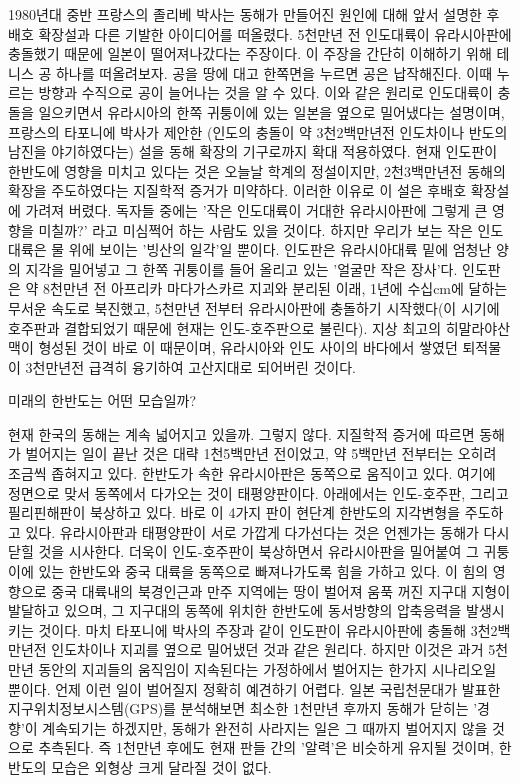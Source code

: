 \documentclass[12pt,a4paper]{book}
\begin{document}
1980년대 중반 프랑스의 졸리베 박사는 동해가 만들어진 원인에 대해 앞서 설명한 후배호 확장설과 다른 기발한 아이디어를 떠올렸다. 5천만년 전 인도대륙이 유라시아판에 충돌했기 때문에 일본이 떨어져나갔다는 주장이다. 이 주장을 간단히 이해하기 위해 테니스 공 하나를 떠올려보자. 공을 땅에 대고 한쪽면을 누르면 공은 납작해진다. 이때 누르는 방향과 수직으로 공이 늘어나는 것을 알 수 있다. 이와 같은 원리로 인도대륙이 충돌을 일으키면서 유라시아의 한쪽 귀퉁이에 있는 일본을 옆으로 밀어냈다는 설명이며, 프랑스의 타포니에 박사가 제안한 (인도의 충돌이 약 3천2백만년전 인도차이나 반도의 남진을 야기하였다는) 설을 동해 확장의 기구로까지 확대 적용하였다. 현재 인도판이 한반도에 영향을 미치고 있다는 것은 오늘날 학계의 정설이지만, 2천3백만년전 동해의 확장을 주도하였다는 지질학적 증거가 미약하다. 이러한 이유로 이 설은 후배호 확장설에 가려져 버렸다. 
독자들 중에는 '작은 인도대륙이 거대한 유라시아판에 그렇게 큰 영향을 미칠까?' 라고 미심쩍어 하는 사람도 있을 것이다. 하지만 우리가 보는 작은 인도대륙은 물 위에 보이는 '빙산의 일각'일 뿐이다. 인도판은 유라시아대륙 밑에 엄청난 양의 지각을 밀어넣고 그 한쪽 귀퉁이를 들어 올리고 있는 '얼굴만 작은 장사'다. 인도판은 약 8천만년 전 아프리카 마다가스카르 지괴와 분리된 이래, 1년에 수십cm에 달하는 무서운 속도로 북진했고, 5천만년 전부터 유라시아판에 충돌하기 시작했다(이 시기에 호주판과 결합되었기 때문에 현재는 인도-호주판으로 불린다). 지상 최고의 히말라야산맥이 형성된 것이 바로 이 때문이며, 유라시아와 인도 사이의 바다에서 쌓였던 퇴적물이 3천만년전 급격히 융기하여 고산지대로 되어버린 것이다.

미래의 한반도는 어떤 모습일까?

현재 한국의 동해는 계속 넓어지고 있을까. 그렇지 않다. 지질학적 증거에 따르면 동해가 벌어지는 일이 끝난 것은 대략 1천5백만년 전이었고, 약 5백만년 전부터는 오히려 조금씩 좁혀지고 있다. 
한반도가 속한 유라시아판은 동쪽으로 움직이고 있다. 여기에 정면으로 맞서 동쪽에서 다가오는 것이 태평양판이다. 아래에서는 인도-호주판, 그리고 필리핀해판이 북상하고 있다. 바로 이 4가지 판이 현단계 한반도의 지각변형을 주도하고 있다. 
유라시아판과 태평양판이 서로 가깝게 다가선다는 것은 언젠가는 동해가 다시 닫힐 것을 시사한다. 더욱이 인도-호주판이 북상하면서 유라시아판을 밀어붙여 그 귀퉁이에 있는 한반도와 중국 대륙을 동쪽으로 빠져나가도록 힘을 가하고 있다. 이 힘의 영향으로 중국 대륙내의 북경인근과 만주 지역에는 땅이 벌어져 움푹 꺼진 지구대 지형이 발달하고 있으며, 그 지구대의 동쪽에 위치한 한반도에 동서방향의 압축응력을 발생시키는 것이다. 마치 타포니에 박사의 주장과 같이 인도판이 유라시아판에 충돌해 3천2백만년전 인도차이나 지괴를 옆으로 밀어냈던 것과 같은 원리다. 
하지만 이것은 과거 5천만년 동안의 지괴들의 움직임이 지속된다는 가정하에서 벌어지는 한가지 시나리오일 뿐이다. 언제 이런 일이 벌어질지 정확히 예견하기 어렵다. 일본 국립천문대가 발표한 지구위치정보시스템(GPS)를 분석해보면 최소한 1천만년 후까지 동해가 닫히는 '경향'이 계속되기는 하겠지만, 동해가 완전히 사라지는 일은 그 때까지 벌어지지 않을 것으로 추측된다. 즉 1천만년 후에도 현재 판들 간의 '알력'은 비슷하게 유지될 것이며, 한반도의 모습은 외형상 크게 달라질 것이 없다. 
\end{document}
